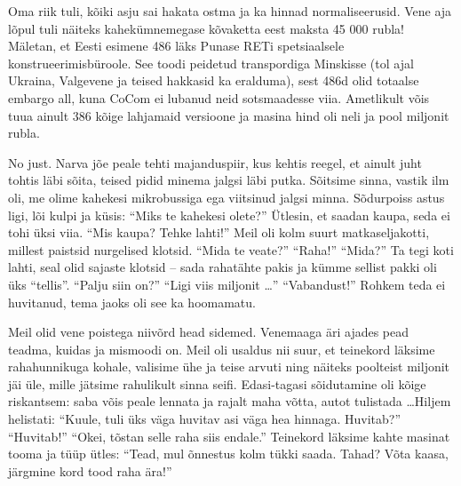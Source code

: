 
Oma riik tuli, kõiki asju sai hakata ostma ja ka hinnad normaliseerusid. Vene 
aja lõpul tuli näiteks kahekümnemegase kõvaketta eest
maksta 45 000 rubla! Mäletan, et Eesti esimene 486 läks Punase 
RETi spetsiaalsele konstrueerimisbüroole. See toodi peidetud transpordiga Minskisse (tol ajal Ukraina, Valgevene ja teised hakkasid ka 
eralduma), sest 486d olid totaalse embargo all, kuna 
CoCom ei lubanud neid sotsmaadesse 
viia. Ametlikult võis tuua ainult 386 kõige lahjamaid versioone ja masina hind oli neli ja pool miljonit rubla.


No just. Narva jõe peale tehti majanduspiir, kus kehtis reegel, et ainult juht tohtis läbi sõita, teised pidid minema jalgsi läbi putka. Sõitsime sinna, vastik 
ilm oli, me olime kahekesi mikrobussiga ega viitsinud jalgsi minna. Sõdurpoiss astus ligi, lõi kulpi ja küsis: \enquote{Miks te kahekesi 
olete?} Ütlesin, et saadan kaupa, seda ei tohi üksi viia. \enquote{Mis kaupa? 
Tehke lahti!} Meil oli kolm suurt matkaseljakotti, millest paistsid nurgelised 
klotsid. \enquote{Mida te veate?} \enquote{Raha!} \enquote{Mida?} Ta tegi
koti lahti, seal olid sajaste klotsid -- sada rahatähte pakis ja kümme sellist pakki oli üks \enquote{tellis}. \enquote{Palju 
siin on?} \enquote{Ligi viis miljonit \ldots} \enquote{Vabandust!} Rohkem teda
ei huvitanud, tema jaoks oli see ka hoomamatu. 

Meil olid vene poistega niivõrd head sidemed. Venemaaga äri ajades pead 
teadma, kuidas ja mismoodi on. Meil oli usaldus nii suur, et teinekord läksime rahahunnikuga kohale, 
valisime ühe ja teise arvuti ning
näiteks poolteist miljonit jäi üle, mille jätsime rahulikult sinna 
seifi. Edasi-tagasi sõidutamine oli kõige riskantsem: saba võis
peale lennata ja rajalt maha võtta, autot tulistada \ldots Hiljem 
helistati: \enquote{Kuule, tuli üks väga huvitav asi väga hea hinnaga. 
Huvitab?} \enquote{Huvitab!} \enquote{Okei, tõstan selle raha siis endale.} 
Teinekord läksime kahte masinat tooma ja tüüp ütles: \enquote{Tead, 
mul õnnestus kolm tükki saada. Tahad? Võta kaasa, järgmine kord tood raha 
ära!} 

